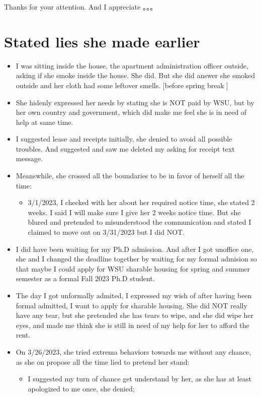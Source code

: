 \documentclass[9pt, b5paper]{article}
\begin{document}
Thanks for your attention. And I appreciate 。。。

\section{Stated lies she made earlier}
\label{sec-8}
\begin{itemize}
\item I was sitting inside the house, the apartment administration officer outside, asking if she smoke inside the house. She did. But she did answer she smoked outside and her cloth had some leftover smells. [before spring break]
\item She hidenly expressed her needs by stating she is NOT paid by WSU, but by her own country and government, which did make me feel she is in need of help at same time.
\item I suggested lease and receipts initially, she denied to avoid all possible troubles. And suggested and saw me deleted my asking for receipt text message.
\item Meanswhile, she crossed all the boundaries to be in favor of herself all the time: 
\begin{itemize}
\item 3/1/2023, I checked with her about her required notice time, she stated 2 weeks. I said I will make sure I give her 2 weeks notice time. But she blured and pretended to misunderstood the communication and stated I claimed to move out on 3/31/2023 but I did NOT.
\end{itemize}
\item I did have been waiting for my Ph.D admission. And after I got unoffice one, she and I changed the deadline together by waiting for my formal admision so that maybe I could apply for WSU sharable housing for spring and summer semester as a formal Fall 2023 Ph.D student.
\item The day I got unformally admited, I expressed my wish of after having been formal admitted, I want to apply for sharable housing. She did NOT really have any tear, but she pretended she has tears to wipe, and she did wipe her eyes, and made me think she is still in need of my help for her to afford the rent.
\item On 3/26/2023, she tried extrema behaviors towards me without any chance, as she on propose all the time lied to pretend her stand:
\begin{itemize}
\item I suggested my turn of chance get understand by her, as she has at least apologized to me once, she denied;

\end{itemize}
\end{itemize}
\end{document}
